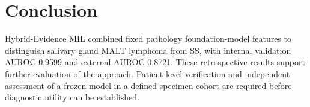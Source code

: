 \section{Conclusion}
Hybrid-Evidence MIL combined fixed pathology foundation-model features to distinguish salivary gland MALT lymphoma from SS, with internal validation AUROC 0.9599 and external AUROC 0.8721. These retrospective results support further evaluation of the approach. Patient-level verification and independent assessment of a frozen model in a defined specimen cohort are required before diagnostic utility can be established.
